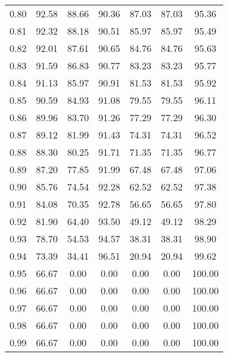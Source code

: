 \begin{tabular}{|c|c|c|c|c|c|c|}
      0.80 &     92.58 &     88.66 &      90.36 &   87.03 &      87.03 &         95.36 \\
      0.81 &     92.32 &     88.18 &      90.51 &   85.97 &      85.97 &         95.49 \\
      0.82 &     92.01 &     87.61 &      90.65 &   84.76 &      84.76 &         95.63 \\
      0.83 &     91.59 &     86.83 &      90.77 &   83.23 &      83.23 &         95.77 \\
      0.84 &     91.13 &     85.97 &      90.91 &   81.53 &      81.53 &         95.92 \\
      0.85 &     90.59 &     84.93 &      91.08 &   79.55 &      79.55 &         96.11 \\
      0.86 &     89.96 &     83.70 &      91.26 &   77.29 &      77.29 &         96.30 \\
      0.87 &     89.12 &     81.99 &      91.43 &   74.31 &      74.31 &         96.52 \\
      0.88 &     88.30 &     80.25 &      91.71 &   71.35 &      71.35 &         96.77 \\
      0.89 &     87.20 &     77.85 &      91.99 &   67.48 &      67.48 &         97.06 \\
      0.90 &     85.76 &     74.54 &      92.28 &   62.52 &      62.52 &         97.38 \\
      0.91 &     84.08 &     70.35 &      92.78 &   56.65 &      56.65 &         97.80 \\
      0.92 &     81.90 &     64.40 &      93.50 &   49.12 &      49.12 &         98.29 \\
      0.93 &     78.70 &     54.53 &      94.57 &   38.31 &      38.31 &         98.90 \\
      0.94 &     73.39 &     34.41 &      96.51 &   20.94 &      20.94 &         99.62 \\
      0.95 &     66.67 &      0.00 &       0.00 &    0.00 &       0.00 &        100.00 \\
      0.96 &     66.67 &      0.00 &       0.00 &    0.00 &       0.00 &        100.00 \\
      0.97 &     66.67 &      0.00 &       0.00 &    0.00 &       0.00 &        100.00 \\
      0.98 &     66.67 &      0.00 &       0.00 &    0.00 &       0.00 &        100.00 \\
      0.99 &     66.67 &      0.00 &       0.00 &    0.00 &       0.00 &        100.00 \\
\bottomrule
\end{tabular}
